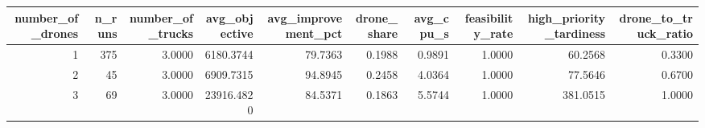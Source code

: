 \begin{tabular}{rrrrrrrrrr}
\toprule
number_of_drones & n_runs & number_of_trucks & avg_objective & avg_improvement_pct & drone_share & avg_cpu_s & feasibility_rate & high_priority_tardiness & drone_to_truck_ratio \\
\midrule
1 & 375 & 3.0000 & 6180.3744 & 79.7363 & 0.1988 & 0.9891 & 1.0000 & 60.2568 & 0.3300 \\
2 & 45 & 3.0000 & 6909.7315 & 94.8945 & 0.2458 & 4.0364 & 1.0000 & 77.5646 & 0.6700 \\
3 & 69 & 3.0000 & 23916.4820 & 84.5371 & 0.1863 & 5.5744 & 1.0000 & 381.0515 & 1.0000 \\
\bottomrule
\end{tabular}
